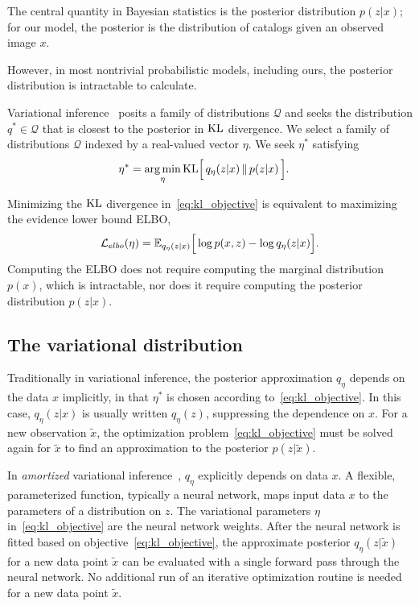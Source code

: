 The central quantity in Bayesian statistics is the posterior distribution $p(z|x)$; for our model, the posterior is the distribution of catalogs given an observed image $x$. 

However, in most
nontrivial probabilistic models, including ours, the posterior distribution is intractable to calculate.

Variational inference~\cite{Blei_2017_vi_review, Jordan_intro_vi, Wainwrite_graph_models_vi}
posits a family of distributions $\mathcal{Q}$ and seeks
the distribution $q^*\in \mathcal{Q}$ that is closest to the posterior
in $\textrm{KL}$ divergence. We select a family of distributions $\mathcal{Q}$ indexed by a real-valued vector $\eta$. We seek $\eta^*$ satisfying
\begin{align}
   \eta^* &= \operatorname*{arg\,min}_{\eta} \mathrm{KL}\Big[\,q_\eta(z | x)\, \| \,p(z | x)\,\Big].
   \label{eq:kl_objective}
\end{align}

Minimizing the $\textrm{KL}$ divergence in~\eqref{eq:kl_objective} is equivalent to maximizing the evidence lower bound ELBO,
\begin{align}
    \mathcal{L}_{elbo}(\eta) = 
    \mathbb{E}_{q_\eta(z | x)}\Big[\log p(x, z) - \log q_\eta(z | x)\Big].
    \label{eq:elbo}
\end{align}
Computing the ELBO does not require computing the marginal distribution $p(x)$, which is intractable, nor does it
require computing the posterior distribution $p(z | x)$.

\subsection{The variational distribution}
\label{sec:var_distr}
Traditionally in variational inference, the posterior approximation 
$q_\eta$ depends on the data $x$ implicitly, 
in that $\eta^*$ is chosen according to~\eqref{eq:kl_objective}.
In this case, $q_\eta(z | x)$ is usually written $q_\eta(z)$, suppressing the dependence on $x$. For a new observation $\tilde x$, the optimization problem~\eqref{eq:kl_objective} must be solved again for $\tilde x$ to find an 
approximation to the posterior $p(z | \tilde x)$. 

In {\itshape amortized} variational
inference~\cite{kingma2013autoencoding, rezende2014stochastic}, $q_\eta$ explicitly depends on data $x$. A flexible, parameterized function, typically a neural network, maps input data $x$ to
the parameters of a distribution on $z$. 
The variational parameters $\eta$ in~\eqref{eq:kl_objective} 
are the neural network weights. 
After the neural network is fitted based on 
objective~\eqref{eq:kl_objective}, the 
approximate posterior $q_\eta(z | \tilde x)$ for a new data point 
$\tilde x$ can be evaluated with a single forward pass through the neural network. 
No additional run of an iterative optimization routine is needed for a new data point $\tilde x$. 

